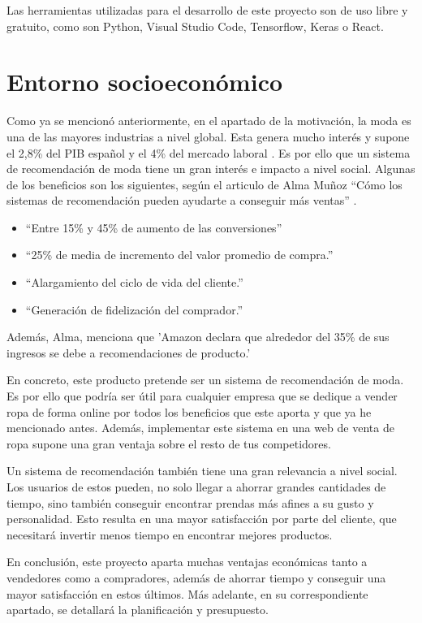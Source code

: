 \documentclass[12pt]{report} %
\begin{document}
	Las herramientas utilizadas para el desarrollo de este proyecto son de uso libre y gratuito, como son Python,
	Visual Studio Code, Tensorflow, Keras o React.
	\section{Entorno socioeconómico}
	Como ya se mencionó anteriormente, en el apartado de la motivación, la moda es una de las mayores industrias a nivel global.
	Esta genera mucho interés y supone el 2,8\% del PIB español y el 4\% del mercado laboral \cite{estadisticas-moda}. Es por ello
	que un sistema de recomendación de moda tiene un gran interés e impacto a nivel social. Algunas de los beneficios son los siguientes,
	según el articulo de Alma Muñoz ``Cómo los sistemas de recomendación pueden ayudarte a conseguir más ventas'' \cite{alma}.
	\begin{itemize}
		\item ``Entre 15\% y 45\% de aumento de las conversiones''
		\item ``25\% de media de incremento del valor promedio de compra.''
		\item ``Alargamiento del ciclo de vida del cliente.''
		\item ``Generación de fidelización del comprador.''
	\end{itemize}


	Además, Alma, menciona que 'Amazon declara que alrededor del 35\% de sus ingresos se debe a recomendaciones de producto.'


	En concreto, este producto pretende ser un sistema de recomendación de moda. Es por ello que podría ser útil para cualquier empresa
	que se dedique a vender ropa de forma online por todos los beneficios que este aporta y que ya he mencionado antes.
	Además, implementar este sistema en una web de venta de ropa supone una gran ventaja sobre el resto de tus competidores.
	
	Un sistema de recomendación también tiene una gran relevancia a nivel social. Los usuarios de estos pueden, no solo llegar
	a ahorrar grandes cantidades de tiempo, sino también conseguir encontrar prendas más afines a su gusto y personalidad. Esto
	resulta en una mayor satisfacción por parte del cliente, que necesitará invertir menos tiempo en encontrar mejores productos.


	En conclusión, este proyecto aparta muchas ventajas económicas tanto a vendedores como a compradores, además de ahorrar tiempo
	y conseguir una mayor satisfacción en estos últimos. Más adelante, en su correspondiente apartado, se detallará la planificación y presupuesto.
\end{document}
